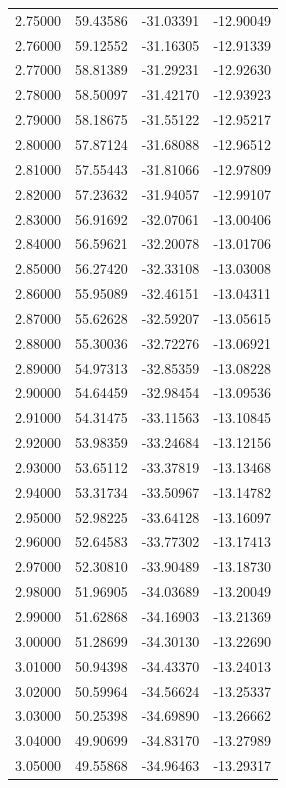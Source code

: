 \begin{table}
\begin{tabular}{llll}
2.75000 & 59.43586 & -31.03391 & -12.90049 \\
2.76000 & 59.12552 & -31.16305 & -12.91339 \\
2.77000 & 58.81389 & -31.29231 & -12.92630 \\
2.78000 & 58.50097 & -31.42170 & -12.93923 \\
2.79000 & 58.18675 & -31.55122 & -12.95217 \\
2.80000 & 57.87124 & -31.68088 & -12.96512 \\
2.81000 & 57.55443 & -31.81066 & -12.97809 \\
2.82000 & 57.23632 & -31.94057 & -12.99107 \\
2.83000 & 56.91692 & -32.07061 & -13.00406 \\
2.84000 & 56.59621 & -32.20078 & -13.01706 \\
2.85000 & 56.27420 & -32.33108 & -13.03008 \\
2.86000 & 55.95089 & -32.46151 & -13.04311 \\
2.87000 & 55.62628 & -32.59207 & -13.05615 \\
2.88000 & 55.30036 & -32.72276 & -13.06921 \\
2.89000 & 54.97313 & -32.85359 & -13.08228 \\
2.90000 & 54.64459 & -32.98454 & -13.09536 \\
2.91000 & 54.31475 & -33.11563 & -13.10845 \\
2.92000 & 53.98359 & -33.24684 & -13.12156 \\
2.93000 & 53.65112 & -33.37819 & -13.13468 \\
2.94000 & 53.31734 & -33.50967 & -13.14782 \\
2.95000 & 52.98225 & -33.64128 & -13.16097 \\
2.96000 & 52.64583 & -33.77302 & -13.17413 \\
2.97000 & 52.30810 & -33.90489 & -13.18730 \\
2.98000 & 51.96905 & -34.03689 & -13.20049 \\
2.99000 & 51.62868 & -34.16903 & -13.21369 \\
3.00000 & 51.28699 & -34.30130 & -13.22690 \\
3.01000 & 50.94398 & -34.43370 & -13.24013 \\
3.02000 & 50.59964 & -34.56624 & -13.25337 \\
3.03000 & 50.25398 & -34.69890 & -13.26662 \\
3.04000 & 49.90699 & -34.83170 & -13.27989 \\
3.05000 & 49.55868 & -34.96463 & -13.29317 \\

\end{tabular}
\end{table}
